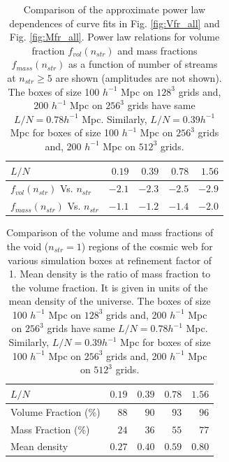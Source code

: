 \begin{table}
  \caption{Comparison of the approximate power law dependences of curve fits in Fig. \ref{fig:Vfr_all} and Fig. \ref{fig:Mfr_all}. Power law relations for volume fraction $f_{vol}(n_{str})$ and mass fractions $f_{mass} (n_{str}) $ as a function of number of streams at $n_{str} \geq 5$ are shown (amplitudes are not shown). The boxes of size 100 $h^{-1}$ Mpc on  $128^{3}$ grids and, 200 $h^{-1}$ Mpc on  $256^{3}$ grids have same  $L/N = 0.78 h^{-1}$ Mpc. Similarly, $L/N = 0.39 h^{-1}$ Mpc for boxes of size 100 $h^{-1}$ Mpc on  $256^{3}$ grids and, 200 $h^{-1}$ Mpc on  $512^{3}$ grids.}
\begin{tabular}{|l|r|r|r|r|}
\hline
$L/N$                & $0.19$ & $0.39$& $0.78$ & $1.56$  \\ \hline
$f_{vol} (n_{str}) $ Vs. $n_{str}$                 & $-2.1$   & $-2.3$    & $-2.5$      & $-2.9$  \\ \hline
$f_{mass} (n_{str}) $   Vs. $n_{str}$            & $-1.1$   & $-1.2$   & $-1.4$       & $-2.0$     \\ \hline
\end{tabular}
 \label{tab:Compare_Slopes}
\end{table}



 \begin{table}
  \caption{Comparison of the volume and mass fractions of the void ($n_{str} = 1$) regions of the cosmic web for various simulation boxes at refinement factor of 1. Mean density is the ratio of mass fraction to the volume fraction. It is given in units of the mean density of the universe. The boxes of size 100 $h^{-1}$ Mpc on  $128^{3}$ grids and, 200 $h^{-1}$ Mpc on  $256^{3}$ grids have same  $L/N = 0.78 h^{-1}$ Mpc. Similarly, $L/N = 0.39 h^{-1}$ Mpc for boxes of size 100 $h^{-1}$ Mpc on  $256^{3}$ grids and, 200 $h^{-1}$ Mpc on  $512^{3}$ grids.}
\begin{tabular}{|l|r|r|r|r|}
\hline
$L/N$                & $0.19$ & $0.39$& $0.78$ & $1.56$  \\ \hline
Volume Fraction (\%)                 & $88$   & $90$    & $93$      & $96$  \\ \hline
Mass Fraction   (\%)               & $24$   & $36$   & $55$       & $77$     \\ \hline
Mean density                    & $0.27$ & $0.40$    & $0.59$        & $0.80$   \\ \hline
\end{tabular}
 \label{tab:Compare_LN}
\end{table}


